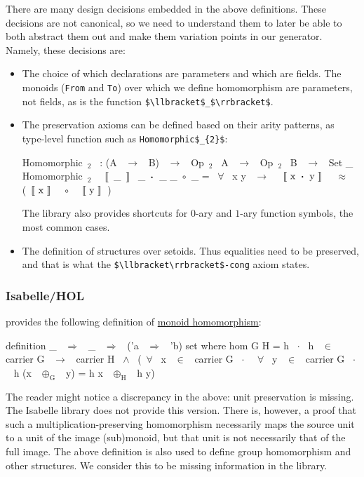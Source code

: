 There are many design decisions embedded in the above definitions. These
decisions are not canonical, so we need to understand them to later
be able to both abstract them out and make them variation points in our
generator. Namely, these decisions are:
\begin{itemize}
    \item The choice of which declarations are parameters and which are fields.
    The monoids (\verb|From| and \verb|To|) over which we define homomorphism
    are parameters, not fields, as is the function
    \lstinline[mathescape]|$\llbracket$_$\rrbracket$|.
    \item The preservation axioms can be defined based on their arity
    patterns, as type-level function such as
    \lstinline[mathescape]|Homomorphic$_{2}$|:
    \begin{agdacode}
Homomorphic~$_{2}$~ : (A ~$\to$~ B) ~$\to$~ Op~$_2$~ A ~$\to$~ Op~$_2$~ B ~$\to$~ Set _ 
Homomorphic~$_{2}$~ ~$\llbracket$~_~$\rrbracket$~ _~$\boldsymbol{\cdot}$~_ _~$\circ$~_ =
  ~$\forall$~ x y ~$\to$~ ~$\llbracket \text{ x } \boldsymbol{\cdot} \text{ y } \rrbracket$~ ~$\approx$~ (~$\llbracket \text{ x } \rrbracket$~ ~$\circ$~ ~$\llbracket \text{ y } \rrbracket$~)
    \end{agdacode}
    The library also provides shortcuts for $0$-ary and $1$-ary function
    symbols, the most common cases.
    \item The definition of structures over setoids. Thus equalities need 
    to be preserved, and that is what the 
    \lstinline[mathescape]|$\llbracket\rrbracket$-cong| axiom states.
\end{itemize}

\subsubsection{Isabelle/HOL}
provides the following definition of \href{https://isabelle.in.tum.de/website-Isabelle2019/dist/library/HOL/HOL-Algebra/Group.html}{monoid homomorphism}:

\begin{isabellecode}
definition  _ ~$\Rightarrow$~ _ ~$\Rightarrow$~ ('a ~$\Rightarrow$~ 'b) set where 
hom G H =
  {h ~$\cdot$~ h ~$\in$~ carrier G ~$\to$~ carrier H ~$\wedge$~ 
  (~$\forall$~ x ~$\in$~ carrier G ~$\cdot$~ ~$\forall$~ y ~$\in$~ carrier G  ~$\cdot$~ 
    h (x ~$\oplus_\text{G}$~ y) = h x ~$\oplus_\text{H}$~ h y)}
\end{isabellecode}

The reader might notice a discrepancy in the above: unit preservation is
missing.  The Isabelle library does not provide this version.
There is, however, a proof that such a multiplication-preserving homomorphism
necessarily maps the source unit to a unit of the image (sub)monoid, but that
unit is not necessarily that of the full image. The above definition is also
used to define group homomorphism and other structures. We consider
this to be missing information in the library. 


